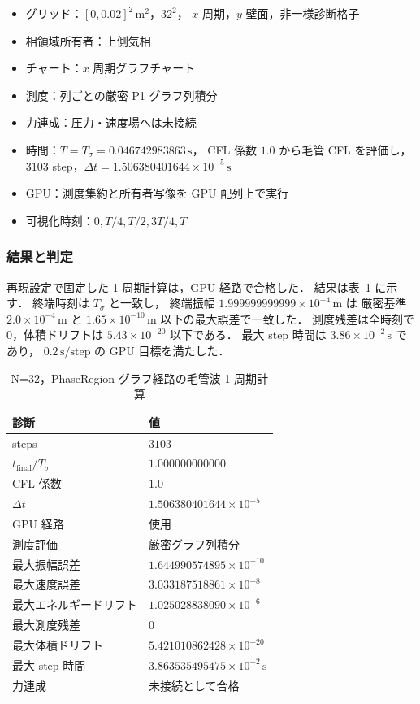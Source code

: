 \begin{itemize}[noitemsep,leftmargin=2em]
  \item グリッド：$[0,0.02]^2\,\mathrm{m}^2$，$32^2$，
        $x$ 周期，$y$ 壁面，非一様診断格子
  \item 相領域所有者：上側気相
  \item チャート：$x$ 周期グラフチャート
  \item 測度：列ごとの厳密 P1 グラフ列積分
  \item 力連成：圧力・速度場へは未接続
  \item 時間：$T=T_\sigma=0.046742983863\,\mathrm{s}$，
        CFL 係数 $1.0$ から毛管 CFL を評価し，
        $3103$ step，$\Delta t=1.506380401644\times10^{-5}\,\mathrm{s}$
  \item GPU：測度集約と所有者写像を GPU 配列上で実行
  \item 可視化時刻：$0,T/4,T/2,3T/4,T$
\end{itemize}

\subsubsection{結果と判定}

再現設定で固定した 1 周期計算は，GPU 経路で合格した．
結果は表~\ref{tab:ch14_phase_region_capillary_graph} に示す．
終端時刻は $T_\sigma$ と一致し，
終端振幅 $1.999999999999\times10^{-4}\,\mathrm{m}$ は
厳密基準 $2.0\times10^{-4}\,\mathrm{m}$ と
$1.65\times10^{-10}\,\mathrm{m}$ 以下の最大誤差で一致した．
測度残差は全時刻で 0，体積ドリフトは
$5.43\times10^{-20}$ 以下である．
最大 step 時間は $3.86\times10^{-2}\,\mathrm{s}$ であり，
$0.2\,\mathrm{s/step}$ の GPU 目標を満たした．

\begin{table}[!htbp]
\caption{N=32，PhaseRegion グラフ経路の毛管波 1 周期計算}
\label{tab:ch14_phase_region_capillary_graph}
\centering\small
\begin{tabular}{ll}
\toprule
診断 & 値 \\
\midrule
steps & $3103$ \\
$t_{\mathrm{final}}/T_\sigma$ & $1.000000000000$ \\
CFL 係数 & $1.0$ \\
$\Delta t$ & $1.506380401644\times10^{-5}$ \\
GPU 経路 & 使用 \\
測度評価 & 厳密グラフ列積分 \\
最大振幅誤差 & $1.644990574895\times10^{-10}$ \\
最大速度誤差 & $3.033187518861\times10^{-8}$ \\
最大エネルギードリフト & $1.025028838090\times10^{-6}$ \\
最大測度残差 & $0$ \\
最大体積ドリフト & $5.421010862428\times10^{-20}$ \\
最大 step 時間 & $3.863535495475\times10^{-2}\,\mathrm{s}$ \\
力連成 & 未接続として合格 \\
\bottomrule
\end{tabular}
\end{table}

